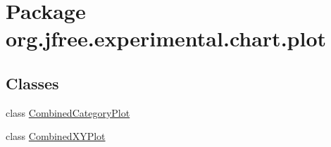 \hypertarget{namespaceorg_1_1jfree_1_1experimental_1_1chart_1_1plot}{}\section{Package org.\+jfree.\+experimental.\+chart.\+plot}
\label{namespaceorg_1_1jfree_1_1experimental_1_1chart_1_1plot}
\subsection*{Classes}
\begin{DoxyCompactItemize}
\item 
class \mbox{\hyperlink{classorg_1_1jfree_1_1experimental_1_1chart_1_1plot_1_1_combined_category_plot}{Combined\+Category\+Plot}}
\item 
class \mbox{\hyperlink{classorg_1_1jfree_1_1experimental_1_1chart_1_1plot_1_1_combined_x_y_plot}{Combined\+X\+Y\+Plot}}
\end{DoxyCompactItemize}
